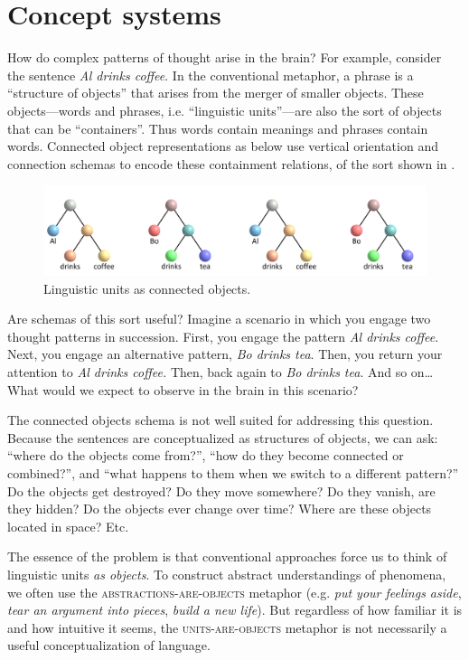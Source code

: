 \section{Concept systems}

How do complex patterns of thought arise in the brain? For example, consider the sentence \textit{Al drinks coffee}. In the conventional metaphor, a phrase is a “structure of objects” that arises from the merger of smaller objects. These objects—words and phrases, i.e. “linguistic units”—are also the sort of objects that can be “containers”. Thus words contain meanings and phrases contain words. Connected object representations as below use vertical orientation and connection schemas to encode these containment relations, of the sort shown in {}.

  
\begin{figure}
\includegraphics[width=\textwidth]{figures/Tilsen-img8.png}
\caption{Linguistic units as connected objects.}
\label{fig:2:1}
\end{figure}
 

  Are schemas of this sort useful? Imagine a scenario in which you engage two thought patterns in succession. First, you engage the pattern \textit{Al drinks coffee}. Next, you engage an alternative pattern, \textit{Bo drinks tea}. Then, you return your attention to \textit{Al drinks coffee.} Then, back again to \textit{Bo drinks tea}. And so on… What would we expect to observe in the brain in this scenario? 

  The connected objects schema is not well suited for addressing this question. Because the sentences are conceptualized as structures of objects, we can ask: “where do the objects come from?”, “how do they become connected or combined?”, and “what happens to them when we switch to a different pattern?” Do the objects get destroyed? Do they move somewhere? Do they vanish, are they hidden? Do the objects ever change over time? Where are these objects located in space? Etc.

  The essence of the problem is that conventional approaches force us to think of linguistic units \textit{as objects}. To construct abstract understandings of phenomena, we often use the \textsc{abstractions-}\textsc{are}\textsc{{}-objects} metaphor (e.g. \textit{put your feelings aside}, \textit{tear an argument into pieces}, \textit{build a new life}). But regardless of how familiar it is and how intuitive it seems, the \textsc{units}\textsc{{}-are-}\textsc{objects} metaphor is not necessarily a useful conceptualization of language. 

